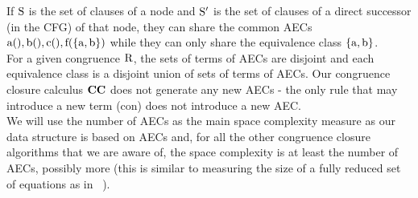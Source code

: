 If $\mathrm{S}$ is the set of clauses of a node and $\mathrm{S'}$ is the set of clauses of a direct successor (in the CFG) of that node, they can share the common AECs\\ $\mathrm{a(),b(),c(),f(\left\{\mathrm{a,b}\right\})}$ while they can only share the equivalence class $\mathrm{\left\{\mathrm{a,b}\right\}}$.\\
For a given congruence $\mathrm{R}$, the sets of terms of AECs are disjoint and each equivalence class is a disjoint union of sets of terms of AECs.
Our congruence closure calculus $\mathrm{\mathbf{CC}}$ does not generate any new AECs - the only rule that may introduce a new term (con) does not introduce a new AEC.\\
We will use the number of AECs as the main space complexity measure as our data structure is based on AECs and, for all the other congruence closure algorithms that we are aware of, the space complexity is at least the number of AECs, possibly more (this is similar to measuring the size of a fully reduced set of equations as in ~\cite{GulwaniTiwariNecula04}).

